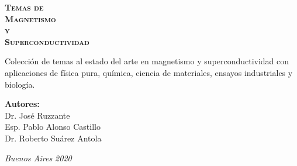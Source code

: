 \documentclass[
11pt, %
spanish,
singlespacing, %
parskip, %
headsepline, %
]{MastersDoctoralThesis} %
\begin{document}
\frontmatter %
\begin{titlepage}
\begin{center}


\vspace{10cm}

{\fontsize{20}{24}\selectfont \textsc{\bfseries Temas de}} 
\vspace{4.0cm} \\ 
{\fontsize{35}{37}\selectfont \textsc{\bfseries Magnetismo }}
\vspace{30px} \\ 
{\fontsize{37}{37}\selectfont \textsc{\bfseries y }}
\vspace{30px}\\ 
{\fontsize{35}{37}\selectfont \textsc{\bfseries Superconductividad }}

\vspace{1.5cm}
Colección de temas al estado del arte en magnetismo y superconductividad con aplicaciones de física pura, química, ciencia de materiales, ensayos industriales y biología. 

\vspace{1.5cm}




\vspace{1.5cm}
\LARGE\textbf{Autores:}\\
Dr. José Ruzzante \\ %
Esp. Pablo Alonso Castillo \\ %
Dr. Roberto Suárez Antola \\

\vspace{4.5cm}

\large
 


\textit{Buenos Aires 2020}
\end{center}
\end{titlepage}
\end{document}

